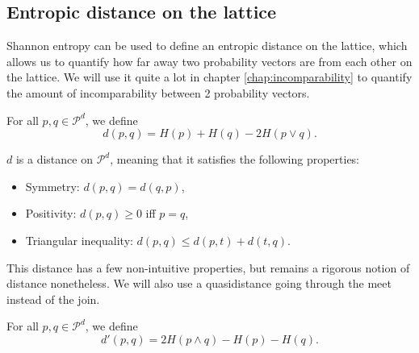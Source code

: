 \subsection{Entropic distance on the lattice} \label{sec:entropic_distances}

Shannon entropy can be used to define an entropic distance on the lattice, which allows us to quantify how far away two probability vectors are from each other on the lattice. We will use it quite a lot in chapter \ref{chap:incomparability} to quantify the amount of incomparability between 2 probability vectors.

\begin{definition} \label{def:entropic_distance}
    For all $p, q \in \mathcal{P}^d$, we define
    \begin{equation}
        d(p, q) = H(p) + H(q) - 2H(p \vee q).
    \end{equation}
\end{definition}

\begin{theorem}
    $d$ is a distance on $\mathcal{P}^d$, meaning that it satisfies the following properties:
    \begin{itemize}
        \item Symmetry: $d(p, q) = d(q, p)$,
        \item Positivity: $d(p, q) \geq 0$  iff $p = q$,
        \item Triangular inequality: $d(p, q) \leq d(p, t) + d(t, q)$.
    \end{itemize}
\end{theorem}

This distance has a few non-intuitive properties, but remains a rigorous notion of distance nonetheless. %
We will also use a quasidistance going through the meet instead of the join.

\begin{definition} \label{def:entropic_quasidistance}
    For all $p, q \in \mathcal{P}^d$, we define
    \begin{equation}
        d'(p, q) = 2H(p \wedge q) - H(p) - H(q).
    \end{equation}
\end{definition}

